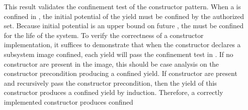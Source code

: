 This result validates the confinement test of the constructor pattern.
When a \TMsubsystem{} is confined in \TMmodelName{}, the initial potential \TMmutability{} of the yield must be confined by the authorized set.
Because initial potential \TMmutability{} is an upper bound on future \TMmutability{}, the \TMsubsystem{} must be confined for the life of the system.
To verify the correctness of a constructor implementation, it suffices to demonstrate that when the constructor declares a subsystem image confined, each yield will pass the confinement test in \TMmodelName{}.
If no constructor \TMcaps{} are present in the \TMsubsystem{} image, this should be case analysis on the constructor precondition producing a confined yield.
If constructor \TMcaps{} are present and recursively pass the constructor precondition, then the yield of this constructor produces a confined yield by induction.
Therefore, a correctly implemented constructor produces confined \TMsubsystems{}



